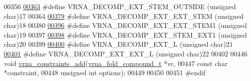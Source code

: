 \begin{DoxyCode}
00356 
\mbox{\hyperlink{group__constraints_gae7554cd3ff089360c02e4920229e221c}{00363}} \textcolor{preprocessor}{#define VRNA\_DECOMP\_EXT\_STEM\_OUTSIDE (unsigned char)17}
00364 
\mbox{\hyperlink{group__constraints_ga06efd054c9271438f6d82d4559d9e69f}{00379}} \textcolor{preprocessor}{#define VRNA\_DECOMP\_EXT\_EXT\_STEM (unsigned char)18}
00380 
\mbox{\hyperlink{group__constraints_ga2e75d7a77118735b32f25422d9686719}{00396}} \textcolor{preprocessor}{#define VRNA\_DECOMP\_EXT\_EXT\_STEM1 (unsigned char)19}
00397 
\mbox{\hyperlink{constraints_8h_a8f9e70176235be3264f4e00a2d5c8649}{00398}} \textcolor{preprocessor}{#define VRNA\_DECOMP\_EXT\_STEM\_EXT1 (unsigned char)20}
00399 
\mbox{\hyperlink{constraints_8h_a7de53a1ec4ae419653020d22e7c20d47}{00400}} \textcolor{preprocessor}{#define VRNA\_DECOMP\_EXT\_L         (unsigned char)21}
\mbox{\hyperlink{constraints_8h_a5ffd7fb5f02801f2c9a82279f0820e67}{00401}} \textcolor{preprocessor}{#define VRNA\_DECOMP\_EXT\_EXT\_L     (unsigned char)22}
00402 
00446 \textcolor{keywordtype}{void} \mbox{\hyperlink{group__constraints_ga35a401f680969a556858a8dd5f1d07cc}{vrna\_constraints\_add}}(\mbox{\hyperlink{group__fold__compound_structvrna__fc__s}{vrna\_fold\_compound\_t}}  *vc,
00447                           \textcolor{keyword}{const} \textcolor{keywordtype}{char}            *constraint,
00448                           \textcolor{keywordtype}{unsigned} \textcolor{keywordtype}{int}          options);
00449 
00450 
00451 \textcolor{preprocessor}{#endif}
\end{DoxyCode}

